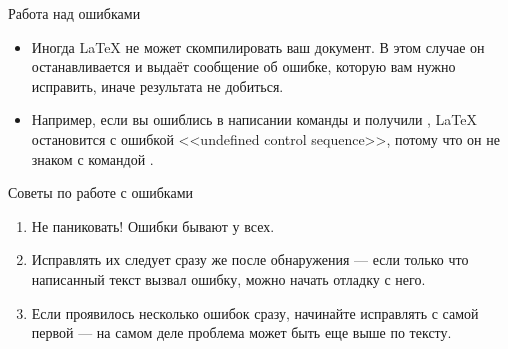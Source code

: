 \documentclass{beamer}
\begin{document}
\begin{frame}[fragile]{Работа над ошибками}
\vspace{-3ex}
\small
\begin{itemize}
\item Иногда \LaTeX{} не может скомпилировать ваш документ. В этом случае он
останавливается и выдаёт сообщение об ошибке, которую вам нужно исправить,
иначе результата не добиться.
\item Например, если вы ошиблись в написании команды  и получили
, \LaTeX{} остановится с ошибкой <<undefined control sequence>>,
потому что он не знаком с командой .
\end{itemize}
\vspace{-1ex}
\begin{tblock}{Советы по работе с ошибками}
\begin{enumerate}
\item Не паниковать! Ошибки бывают у всех.
\item Исправлять их следует сразу же после обнаружения --- если только что написанный
текст вызвал ошибку, можно начать отладку с него.
\item Если проявилось несколько ошибок сразу, начинайте исправлять с самой первой ---
на самом деле проблема может быть еще выше по тексту.
\end{enumerate}
\end{tblock}
\end{frame}
\end{document}
